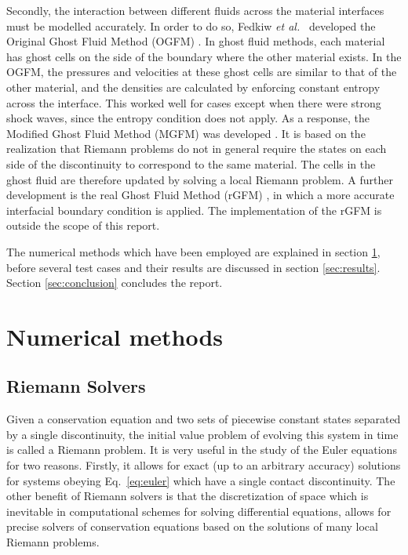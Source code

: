 \documentclass[final,3p,twocolumn,times]{elsarticle}
\begin{document}
Secondly, the interaction between different fluids across the material
interfaces must be modelled accurately. In order to do so, Fedkiw \emph{ et
al.\ } developed the Original Ghost Fluid Method (OGFM)
\cite{fedkiw1999nonoscillatory}. In ghost fluid methods, each material has
ghost cells on the side of the boundary where the other material exists. In the
OGFM, the pressures and velocities at these ghost cells are similar to that of
the other material, and the densities are calculated by enforcing constant
entropy across the interface. This worked well for cases except when there were
strong shock waves, since the entropy condition does not apply. As a response,
the Modified Ghost Fluid Method (MGFM) was developed \cite{liu2003ghost,
sambasivan2009ghost}. It is based on the realization that Riemann problems do
not in general require the states on each side of the discontinuity to
correspond to the same material. The cells in the ghost fluid are therefore
updated by solving a local Riemann problem. A further development is the real
Ghost Fluid Method (rGFM) \cite{wang2006real}, in which a more accurate
interfacial boundary condition is applied. The implementation of the rGFM is
outside the scope of this report. 

The numerical methods which have been employed are explained in section
\ref{sec:numerical}, before several test cases and their results are discussed
in section \ref{sec:results}. Section \ref{sec:conclusion} concludes the
report.

\section{Numerical methods}
\label{sec:numerical}

\subsection{Riemann Solvers}
\label{subsec:riemann}

Given a conservation equation and two sets of piecewise constant states
separated by a single discontinuity, the initial value problem of evolving this
system in time is called a Riemann problem. It is very useful in the study of
the Euler equations for two reasons. Firstly, it allows for exact (up to an
arbitrary accuracy) solutions for systems obeying Eq.\  \eqref{eq:euler} which
have a single contact discontinuity. The other benefit of Riemann solvers is
that the discretization of space which is inevitable in computational schemes
for solving differential equations, allows for precise solvers of conservation
equations based on the solutions of many local Riemann problems. 
\end{document}
